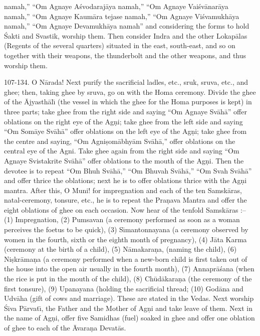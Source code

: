 namah,'' ``Om Agnaye A\'svodaraj\=aya namah,'' ``Om Agnaye Vai\'sv\=anar\=aya namah,'' ``Om Agnaye Kaum\=ara tejase namah,'' ``Om Agnaye Vi\'svamukh\=aya namah,'' ``Om Agnaye Devamukh\=aya namah'' and considering the forms to hold \'Sakti and Svastik, worship them. Then consider Indra and the other Lokap\=alas (Regents of the several quarters) situated in the east, south-east, and so on together with their weapons, the thunderbolt and the other weapons, and thus worship them.

107-134. O N\=arada! Next purify the sacrificial ladles, etc., sruk, sruva, etc., and ghee; then, taking ghee by sruva, go on with the Homa ceremony. Divide the ghee of the \=Ajyasth\=al\={\i} (the vessel in which the ghee for the Homa purposes is kept) in three parts; take ghee from the right side and saying ``Om Agnaye Sv\=ah\=a'' offer oblations on the right eye of the Ag\d{n}i; take ghee from the left side and saying ``Om Som\=aye Sv\=ah\=a'' offer oblations on the left eye of the Ag\d{n}i; take ghee from the centre and saying, ``Om Agni\d{s}om\=abhy\=am Sv\=ah\=a,'' offer oblations on the central eye of the Agni. Take ghee again from the right side and saying ``Om Agnaye Svistakrite Sv\=ah\=a'' offer oblations to the mouth of the Ag\d{n}i. Then the devotee is to repeat ``Om Bhuh Sv\=ah\=a,'' ``Om Bhuvah Sv\=ah\=a,'' ``Om Svah Sv\=ah\=a'' and offer thrice the oblations; next he is to offer oblations thrice with the Ag\d{n}i mantra. After this, O Muni! for impregnation and each of the ten Samsk\=aras, natal-ceremony, tonsure, etc., he is to repeat the Pra\d{n}ava Mantra and offer the eight oblations of ghee on each occasion. Now hear of the tenfold Samsk\=aras :-- (1) Impregnation, (2) Pumsavan (a ceremony performed as soon as a woman perceives the foetus to be quick), (3) S\={\i}mantonnayana (a ceremony observed by women in the fourth, sixth or the eighth month of pregnancy), (4) J\=ata Karma (ceremony at the birth of a child), (5) N\=amakara\d{n}a, (naming the child), (6) Ni\d{s}kr\=ama\d{n}a (a ceremony performed when a new-born child is first taken out of the house into the open air usually in the fourth month), (7) Annapr\=a\'sana (when the rice is put in the mouth of the child), (8) Ch\=ud\=akara\d{n}a (the ceremony of the first tonsure), (9) Upanayana (holding the sacrificial thread; (10) God\=ana and Udv\=aha (gift of cows and marriage). These are stated in the Vedas. Next worship \'Siva P\=arvat\={\i}, the Father and the Mother of Ag\d{n}i and take leave of them. Next in the name of Ag\d{n}i, offer five Samidhas (fuel) soaked in ghee and offer one oblation of ghee to each of the \=Avara\d{n}a Devat\=as.

